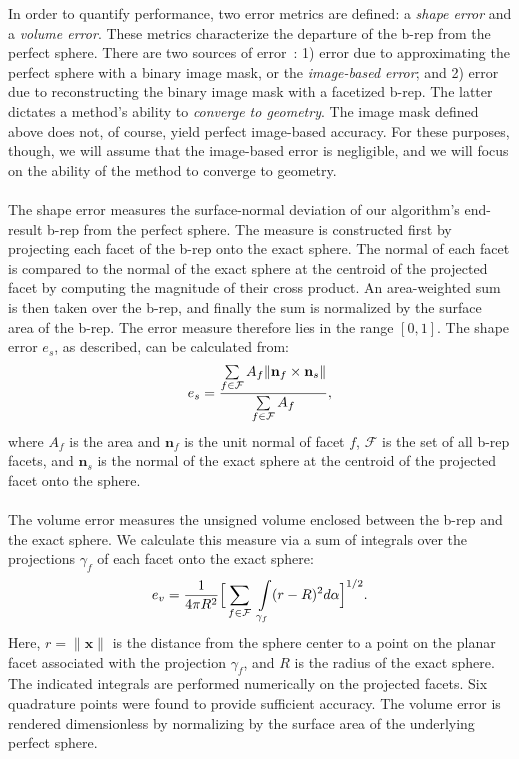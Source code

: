 In order to quantify performance, two error metrics are defined: a {\em shape error} and a {\em volume error}. These metrics characterize the departure of the b-rep from the perfect sphere.  There are two sources of error~\cite{young_2008}: 1) error due to approximating the perfect sphere with a binary image mask, or the {\em image-based error}; and 2) error due to reconstructing the binary image mask with a facetized b-rep.  The latter dictates a method's ability to {\em converge to geometry}. The image mask defined above does not, of course, yield perfect image-based accuracy. For these purposes, though, we will assume that the image-based error is negligible, and we will focus on the ability of the method to converge to geometry.\\ \\
%
The shape error measures the surface-normal deviation of our algorithm's end-result b-rep from the perfect sphere. The measure is constructed first by projecting each facet of the b-rep onto the exact sphere. The normal of each facet is compared to the normal of the exact sphere at the centroid of the projected facet by computing the magnitude of their cross product. An area-weighted sum is then taken over the b-rep, and finally the sum is normalized by the surface area of the b-rep. The error measure therefore lies in the range $\left [0,1\right]$. The shape error $e_s$, as described, can be calculated from:
\begin{equation} 
	e_s = \frac{ \sum \limits_{f\in\mathcal{F}} A_f \lVert {\bf n}_f \times {\bf n}_s \rVert}{\sum \limits_{f\in\mathcal{F}} A_f},
\end{equation}
where $A_f$ is the area and ${\bm n}_f$ is the unit normal of facet $f$, $\mathcal{F}$ is the set of all b-rep facets, and ${\bm n}_s$ is the normal of the exact sphere at the centroid of the projected facet onto the sphere. \\ \\
%
The volume error measures the unsigned volume enclosed between the b-rep and the exact sphere. We calculate this measure via a sum of integrals over the projections $\gamma_f$ of each facet onto the exact sphere: 
\begin{equation}
\label{vol err}
	e_v = \frac{1}{4\pi R^2} \Big[\sum \limits_{f \in \mathcal{F}\textsl{}} \ \int \limits_{\gamma_f} (r - R)^2 d\alpha \Big]^{1/2} .
\end{equation}
Here, $r = \lVert {\bm x} \rVert$ is the distance from the sphere center to a point on the planar facet associated with the projection $\gamma_f$, and $R$ is the radius of the exact sphere.  The indicated integrals are performed numerically on the projected facets. Six quadrature points were found to provide sufficient accuracy. The volume error is rendered dimensionless by normalizing by the surface area of the underlying perfect sphere.
